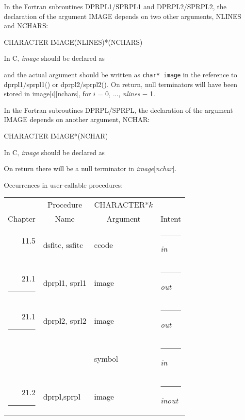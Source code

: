 \documentclass[twoside]{MATH77}
\begin{document}
\begin{description}
In the Fortran subroutines DPRPL1/SPRPL1 and DPRPL2/SPRPL2, the declaration
of the argument IMAGE depends on two other arguments, NLINES and NCHARS:

\hspace{.2in}CHARACTER IMAGE(NLINES)*(NCHARS)

In C, {\em image} should be declared as

\hspace{.2in}{\tt char image[nlines][nchars + 1];}

and the actual argument should be written as {\tt char* image}
in the reference to dprpl1/sprpl1() or dprpl2/sprpl2(). On return, null
terminators will have been stored in image[$i$][nchars], for $i$ = 0,
..., {\em nlines} $-$ 1.

In the Fortran subroutines DPRPL/SPRPL, the declaration of the argument IMAGE
depends on another argument, NCHAR:

\hspace{.2in}CHARACTER IMAGE*(NCHAR)

In C, {\em image} should be declared as

\hspace{.2in}{\tt char image[nchar + 1];}

On return there will be a null terminator in {\em image}[{\em nchar}].

Occurrences in user-callable procedures:\vspace{5pt}

\hspace{-.1in}\begin{tabular}{rll@{}l}
& \multicolumn{1}{c}{Procedure} & \multicolumn{1}{c}{CHARACTER*$k$}\\
\multicolumn{1}{c}{Chapter} & \multicolumn{1}{c}{Name} &
\multicolumn{1}{c}{Argument} & \multicolumn{1}{c}{Intent}\\
11.5\rule{10pt}{0pt} & dsfitc, ssfitc & \hspace{20pt} ccode &
\rule{5pt}{0pt}{\em in}\\
21.1\rule{10pt}{0pt} & dprpl1, sprl1 & \hspace{20pt} image &
 \rule{5pt}{0pt}{\em out}\\
21.1\rule{10pt}{0pt} & dprpl2, sprl2 & \hspace{20pt} image &
 \rule{5pt}{0pt}{\em out}\\
 & & \hspace{20pt} symbol & \rule{5pt}{0pt}{\em in}\\
21.2\rule{10pt}{0pt} & dprpl,sprpl & \hspace{20pt} image &
 \rule{5pt}{0pt}{\em inout}
\end{tabular}
\end{description}
\end{document}
